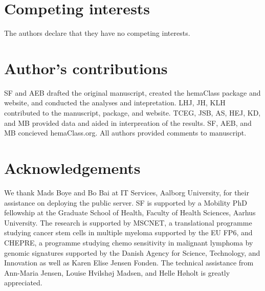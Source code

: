 \documentclass{bmcart}
\begin{document}
\begin{backmatter}

\section*{Competing interests}
The authors declare that they have no competing interests.

\section*{Author's contributions}
SF and AEB drafted the original manuscript, created the hemaClass package and website,
and conducted the analyses and intepretation.
LHJ, JH, KLH contributed to the manuscript, package, and website.
TCEG, JSB, AS, HEJ, KD, and MB provided data and aided in interpreation of the results.
SF, AEB, and MB concieved hemaClass.org.
All authors provided comments to manuscript.

\section*{Acknowledgements}
We thank Mads Boye and Bo Bai at IT Services, Aalborg University, for their assistance on deploying the public server.
SF is supported by a Mobility PhD fellowship at the Graduate School of Health, Faculty of Health Sciences, Aarhus University.
The research is supported by MSCNET, a translational programme studying cancer stem cells in multiple myeloma supported by the EU FP6, and CHEPRE, a programme studying chemo sensitivity in malignant lymphoma by genomic signatures supported by the Danish Agency for Science, Technology, and Innovation as well as Karen Elise Jensen Fonden.
The technical assistance from Ann-Maria Jensen, Louise Hvilsh{\o}j Madsen, and Helle H{\o}holt is greatly appreciated.



\end{backmatter}
\end{document}
